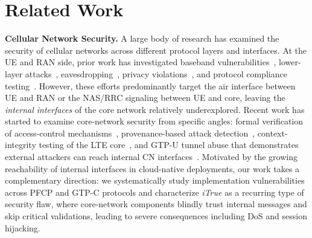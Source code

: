 
\section{Related Work}
\vspace{2pt}\noindent\textbf{Cellular Network Security.}
A large body of research has examined the security of cellular networks across different protocol layers and interfaces. At the UE and RAN side, prior work has investigated baseband vulnerabilities~\cite{kim2021basespec, tu2024logic, maier2020basesafe}, lower-layer attacks~\cite{rupprecht2019breaking, yang2019hiding}, eavesdropping~\cite{rupprecht2020call}, privacy violations~\cite{hussain2019privacy}, and protocol compliance testing~\cite{kim2019touching, hussain2021noncompliance, park2022doltest, khandker2024astra, yang2024oranalyst}.
However, these efforts predominantly target the air interface between UE and RAN or the NAS/RRC signaling between UE and core, leaving the \textit{internal interfaces} of the core network relatively underexplored.
Recent work has started to examine core-network security from specific angles:
formal verification of access-control mechanisms~\cite{akon2023formal, akon2025control},
provenance-based attack detection~\cite{pacherkar2024prov5gc},
context-integrity testing of the LTE core~\cite{son2025citesting},
and GTP-U tunnel abuse that demonstrates external attackers can reach internal CN interfaces~\cite{zhang2025invade, shaik2025uncovering}.
Motivated by the growing reachability of internal interfaces in cloud-native deployments, our work takes a complementary direction: we systematically study implementation vulnerabilities across PFCP and GTP-C protocols and characterize \textit{iTrue} as a recurring type of security flaw, where core-network components blindly trust internal messages and skip critical validations, leading to severe consequences including DoS and session hijacking.

